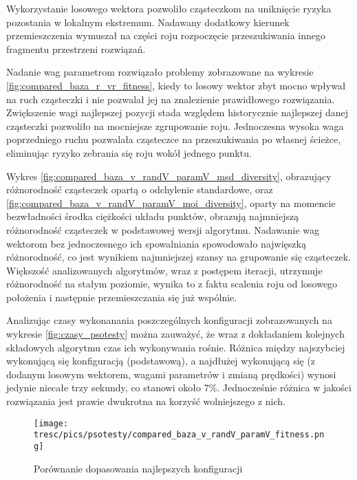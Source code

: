 Wykorzystanie losowego wektora pozwoliło cząsteczkom na uniknięcie ryzyka pozostania w lokalnym ekstremum. Nadawany dodatkowy kierunek przemieszczenia wymuszał na części roju rozpoczęcie przeszukiwania innego fragmentu przestrzeni rozwiązań.

Nadanie wag parametrom rozwiązało problemy zobrazowane na wykresie \ref{fig:compared_baza_r_vr_fitness}, kiedy to losowy wektor zbyt mocno wpływał na ruch cząsteczki i nie pozwalał jej na znalezienie prawidłowego rozwiązania. Zwiększenie wagi najlepszej pozycji stada względem historycznie najlepszej danej cząsteczki pozwoliło na mocniejsze zgrupowanie roju. Jednoczesna wysoka waga poprzedniego ruchu pozwalała cząsteczce na przeszukiwania po własnej ścieżce, eliminując ryzyko zebrania się roju wokół jednego punktu.

Wykres \ref{fig:compared_baza_v_randV_paramV_msd_diversity}, obrazujący różnorodność cząsteczek opartą o odchylenie standardowe, oraz \ref{fig:compared_baza_v_randV_paramV_moi_diversity}, oparty na momencie bezwładności środka ciężkości układu punktów, obrazują najmniejszą różnorodność cząsteczek w podstawowej wersji algorytmu. Nadawanie wag wektorom bez jednoczesnego ich spowalniania spowodowało najwięszką różnorodność, co jest wynikiem najmniejszej szansy na grupowanie się cząsteczek. Większość analizowanych algorytmów, wraz z postępem iteracji, utrzymuje różnorodność na stałym poziomie, wynika to z faktu scalenia roju od losowego położenia i następnie przemieszczania się już wspólnie.

Analizując czasy wykonanania poszczególnych konfiguracji zobrazowanych na wykresie \ref{fig:czasy_psotesty} można zauważyć, że wraz z dokładaniem kolejnych składowych algorytmu czas ich wykonywania rośnie. Różnica między najszybciej wykonującą się konfiguracją (podstawową), a najdłużej wykonującą się (z dodanym losowym wektorem, wagami parametrów i zmianą prędkości) wynosi jedynie niecałe trzy sekundy, co stanowi około 7\%. Jednocześnie różnica w jakości rozwiązania jest prawie dwukrotna na korzyść wolniejszego z nich.

\begin{figure}[H]
\begin{center} 
\texttt{[image: tresc/pics/psotesty/compared\_baza\_v\_randV\_paramV\_fitness.png]}
\caption{Porównanie dopasowania najlepszych konfiguracji}
\label{fig:compared_baza_v_randV_paramV_fitness}
\end{center}
\end{figure}

